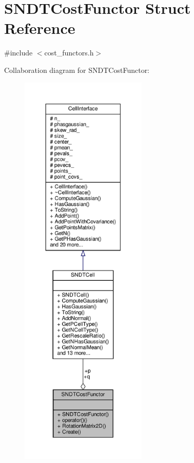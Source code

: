 \hypertarget{structSNDTCostFunctor}{}\section{S\+N\+D\+T\+Cost\+Functor Struct Reference}
\label{structSNDTCostFunctor}


{\ttfamily \#include $<$cost\+\_\+functors.\+h$>$}



Collaboration diagram for S\+N\+D\+T\+Cost\+Functor\+:\nopagebreak
\begin{figure}[H]
\begin{center}
\leavevmode
\includegraphics[height=550pt]{d5/d38/structSNDTCostFunctor__coll__graph}
\end{center}
\end{figure}
